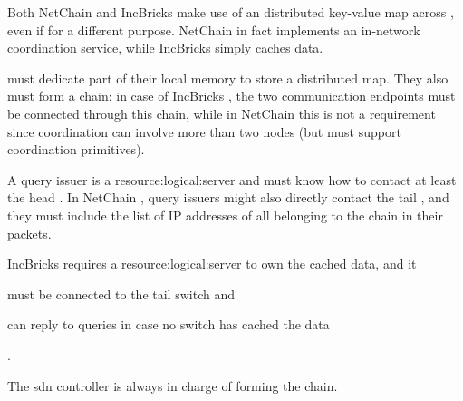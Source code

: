 Both NetChain \cite{netchain} and IncBricks \cite{incbricks} make use of an distributed key-value map across , even if for a different purpose.
NetChain \cite{netchain} in fact implements an in-network coordination service, while IncBricks \cite{incbricks} simply caches data.

 must dedicate part of their local memory to store a distributed map.
They also must form a chain: in case of IncBricks \cite{incbricks}, the two communication endpoints must be connected through this chain, while in NetChain \cite{netchain} this is not a requirement since coordination can involve more than two nodes (but  must support coordination primitives).

A query issuer is a \gls{resource:logical:server} and must know how to contact at least the head .
In NetChain \cite{netchain}, query issuers might also directly contact the tail , and they must include the list of IP addresses of all  belonging to the chain in their packets.

IncBricks \cite{incbricks} requires a \gls{resource:logical:server} to own the cached data, and it
\begin{mylist}
    \item must be connected to the tail switch and
    \item can reply to queries in case no switch has cached the data
\end{mylist}.

The \gls{sdn} controller is always in charge of forming the  chain.